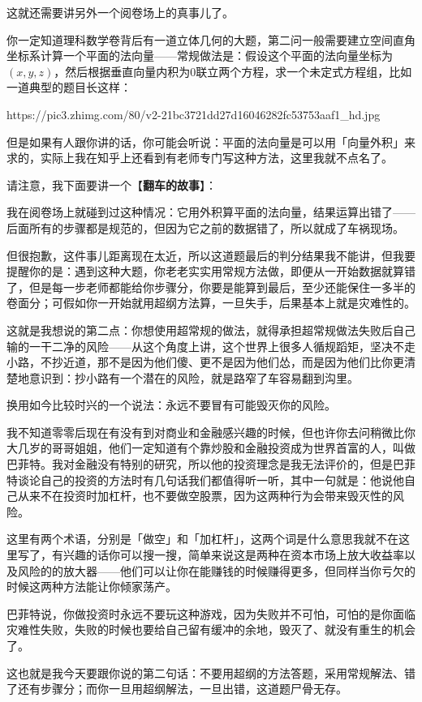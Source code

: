 这就还需要讲另外一个阅卷场上的真事儿了。

你一定知道理科数学卷背后有一道立体几何的大题，第二问一般需要建立空间直角坐标系计算一个平面的法向量——常规做法是：假设这个平面的法向量坐标为$(x,y,z)$，然后根据垂直向量内积为0联立两个方程，求一个未定式方程组，比如一道典型的题目长这样：

{\color{red} https://pic3.zhimg.com/80/v2-21bc3721dd27d16046282fc53753aaf1\_hd.jpg}

但是如果有人跟你讲的话，你可能会听说：平面的法向量是可以用「向量外积」来求的，实际上我在知乎上还看到有老师专门写这种方法，这里我就不点名了。

请注意，我下面要讲一个【{\bfseries 翻车的故事}】：

我在阅卷场上就碰到过这种情况：它用外积算平面的法向量，结果运算出错了——后面所有的步骤都是规范的，但因为它之前的数据错了，所以就成了车祸现场。

但很抱歉，这件事儿距离现在太近，所以这道题最后的判分结果我不能讲，但我要提醒你的是：遇到这种大题，你老老实实用常规方法做，即便从一开始数据就算错了，但是每一步老师都能给你步骤分，你要是能算到最后，至少还能保住一多半的卷面分；可假如你一开始就用超纲方法算，一旦失手，后果基本上就是灾难性的。

这就是我想说的第二点：你想使用超常规的做法，就得承担超常规做法失败后自己输的一干二净的风险——从这个角度上讲，这个世界上很多人循规蹈矩，坚决不走小路，不抄近道，那不是因为他们傻、更不是因为他们怂，而是因为他们比你更清楚地意识到：抄小路有一个潜在的风险，就是路窄了车容易翻到沟里。

换用如今比较时兴的一个说法：永远不要冒有可能毁灭你的风险。

我不知道零零后现在有没有到对商业和金融感兴趣的时候，但也许你去问稍微比你大几岁的哥哥姐姐，他们一定知道有个靠炒股和金融投资成为世界首富的人，叫做巴菲特。我对金融没有特别的研究，所以他的投资理念是我无法评价的，但是巴菲特谈论自己的投资的方法时有几句话我们都值得听一听，其中一句就是：他说他自己从来不在投资时加杠杆，也不要做空股票，因为这两种行为会带来毁灭性的风险。

这里有两个术语，分别是「做空」和「加杠杆」，这两个词是什么意思我就不在这里写了，有兴趣的话你可以搜一搜，简单来说这是两种在资本市场上放大收益率以及风险的的放大器——他们可以让你在能赚钱的时候赚得更多，但同样当你亏欠的时候这两种方法能让你倾家荡产。

巴菲特说，你做投资时永远不要玩这种游戏，因为失败并不可怕，可怕的是你面临灾难性失败，失败的时候也要给自己留有缓冲的余地，毁灭了、就没有重生的机会了。

这也就是我今天要跟你说的第二句话：不要用超纲的方法答题，采用常规解法、错了还有步骤分；而你一旦用超纲解法，一旦出错，这道题尸骨无存。

